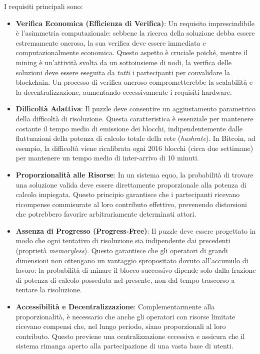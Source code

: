 I requisiti principali sono:
\begin{itemize}
    \item \textbf{Verifica Economica (Efficienza di Verifica)}: Un requisito imprescindibile è l'asimmetria computazionale: sebbene la ricerca della soluzione debba essere estremamente onerosa, la sua verifica deve essere immediata e computazionalmente economica. Questo aspetto è cruciale poiché, mentre il mining è un’attività svolta da un sottoinsieme di nodi, la verifica delle soluzioni deve essere eseguita da \textit{tutti} i partecipanti per convalidare la blockchain. Un processo di verifica oneroso comprometterebbe la scalabilità e la decentralizzazione, aumentando eccessivamente i requisiti hardware.
    
    \item \textbf{Difficoltà Adattiva}: Il puzzle deve consentire un aggiustamento parametrico della difficoltà di risoluzione. Questa caratteristica è essenziale per mantenere costante il tempo medio di emissione dei blocchi, indipendentemente dalle fluttuazioni della potenza di calcolo totale della rete (\textit{hashrate}). In Bitcoin, ad esempio, la difficoltà viene ricalibrata ogni 2016 blocchi (circa due settimane) per mantenere un tempo medio di inter-arrivo di 10 minuti.
    
    \item \textbf{Proporzionalità alle Risorse}: In un sistema equo, la probabilità di trovare una soluzione valida deve essere direttamente proporzionale alla potenza di calcolo impiegata. Questo principio garantisce che i partecipanti ricevano ricompense commisurate al loro contributo effettivo, prevenendo distorsioni che potrebbero favorire arbitrariamente determinati attori.
    
    \item \textbf{Assenza di Progresso (Progress-Free)}: Il puzzle deve essere progettato in modo che ogni tentativo di risoluzione sia indipendente dai precedenti (proprietà \textit{memoryless}). Questo garantisce che gli operatori di grandi dimensioni non ottengano un vantaggio spropositato dovuto all'accumulo di lavoro: la probabilità di minare il blocco successivo dipende solo dalla frazione di potenza di calcolo posseduta nel presente, non dal tempo trascorso a tentare la risoluzione.
    
    \item \textbf{Accessibilità e Decentralizzazione}: Complementarmente alla proporzionalità, è necessario che anche gli operatori con risorse limitate ricevano compensi che, nel lungo periodo, siano proporzionali al loro contributo. Questo previene una centralizzazione eccessiva e assicura che il sistema rimanga aperto alla partecipazione di una vasta base di utenti.
\end{itemize}
